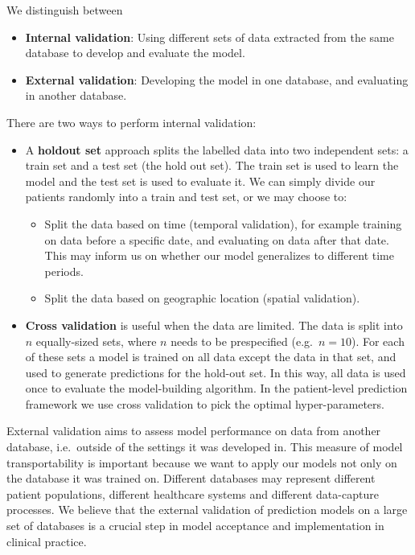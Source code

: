 \documentclass[11pt]{book}
\providecommand{\tightlist}{%
  \setlength{\itemsep}{0pt}\setlength{\parskip}{0pt}}
\theoremstyle{definition}
\theoremstyle{definition}
\theoremstyle{definition}
\theoremstyle{remark}
\begin{document}
We distinguish between

\begin{itemize}
\tightlist
\item
  \textbf{Internal validation}: Using different sets of data extracted from the same database to develop and evaluate the model.
\item
  \textbf{External validation}: Developing the model in one database, and evaluating in another database.  
\end{itemize}

There are two ways to perform internal validation:

\begin{itemize}
\tightlist
\item
  A \textbf{holdout set} approach splits the labelled data into two independent sets: a train set and a test set (the hold out set). The train set is used to learn the model and the test set is used to evaluate it. We can simply divide our patients randomly into a train and test set, or we may choose to:

  \begin{itemize}
  \tightlist
  \item
    Split the data based on time (temporal validation), for example training on data before a specific date, and evaluating on data after that date. This may inform us on whether our model generalizes to different time periods.
  \item
    Split the data based on geographic location (spatial validation).  
  \end{itemize}
\item
  \textbf{Cross validation} is useful when the data are limited. The data is split into \(n\) equally-sized sets, where \(n\) needs to be prespecified (e.g.~\(n=10\)). For each of these sets a model is trained on all data except the data in that set, and used to generate predictions for the hold-out set. In this way, all data is used once to evaluate the model-building algorithm. In the patient-level prediction framework we use cross validation to pick the optimal hyper-parameters. 
\end{itemize}

External validation aims to assess model performance on data from another database, i.e.~outside of the settings it was developed in. This measure of model transportability is important because we want to apply our models not only on the database it was trained on. Different databases may represent different patient populations, different healthcare systems and different data-capture processes. We believe that the external validation of prediction models on a large set of databases is a crucial step in model acceptance and implementation in clinical practice.
\end{document}
